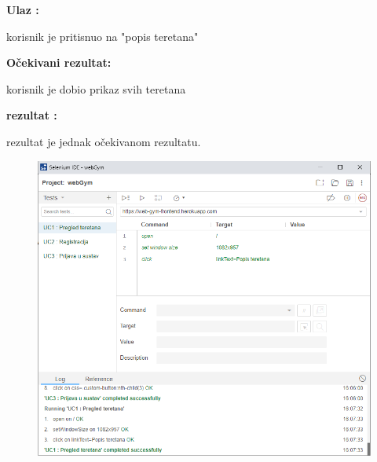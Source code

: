 	            \noindent {}
                \begin{packed_item}
						\item  \textbf{Ulaz : } 
						\item[] \begin{packed_enum}
	
							\item korisnik je pritisnuo na "popis teretana"

						\end{packed_enum}
						\item  \textbf{Očekivani rezultat: } 
						\item[] \begin{packed_enum}
	
							\item korisnik je dobio prikaz svih teretana

						\end{packed_enum}
						
						\item  \textbf{rezultat : }
						\item[] \begin{packed_enum}
	
							\item rezultat je jednak očekivanom rezultatu.

						\end{packed_enum}

				\end{packed_item}
				
				\begin{figure}[H]
        			\hspace*{-1.5cm}
        			\includegraphics[scale=0.5]{dijagrami/UC1.PNG} %
        			\centering
        			\label{fig:promjene}
	        	\end{figure}
				

